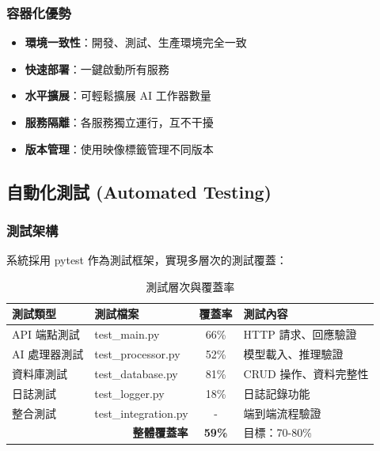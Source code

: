 \documentclass[a4paper,14pt,oneside]{article}
\begin{document}
\subsubsection{容器化優勢}

\begin{itemize}
    \item \textbf{環境一致性}：開發、測試、生產環境完全一致
    \item \textbf{快速部署}：一鍵啟動所有服務
    \item \textbf{水平擴展}：可輕鬆擴展 AI 工作器數量
    \item \textbf{服務隔離}：各服務獨立運行，互不干擾
    \item \textbf{版本管理}：使用映像標籤管理不同版本
\end{itemize}

\subsection{自動化測試 (Automated Testing)}

\subsubsection{測試架構}

系統採用 pytest 作為測試框架，實現多層次的測試覆蓋：

\begin{table}[H]
    \centering
    \caption{測試層次與覆蓋率}
    \begin{tabular}{|l|l|c|p{4cm}|}
        \hline
        \textbf{測試類型} & \textbf{測試檔案} & \textbf{覆蓋率} & \textbf{測試內容} \\
        \hline
        API 端點測試 & test\_main.py & 66\% & HTTP 請求、回應驗證 \\
        \hline
        AI 處理器測試 & test\_processor.py & 52\% & 模型載入、推理驗證 \\
        \hline
        資料庫測試 & test\_database.py & 81\% & CRUD 操作、資料完整性 \\
        \hline
        日誌測試 & test\_logger.py & 18\% & 日誌記錄功能 \\
        \hline
        整合測試 & test\_integration.py & - & 端到端流程驗證 \\
        \hline
        \multicolumn{2}{|r|}{\textbf{整體覆蓋率}} & \textbf{59\%} & 目標：70-80\% \\
        \hline
    \end{tabular}
\end{table}
\end{document}
